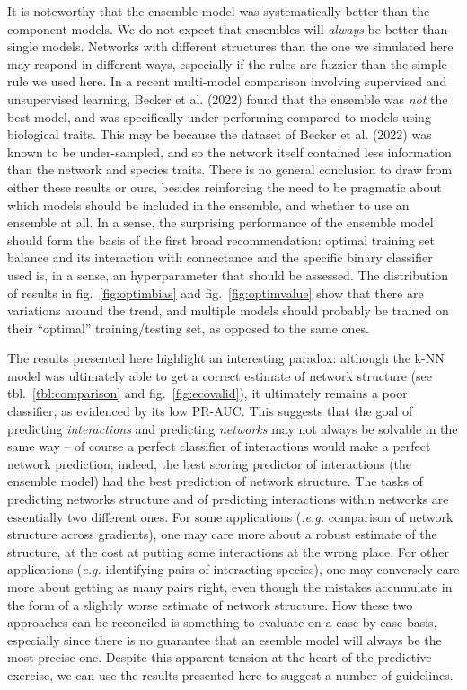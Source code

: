\documentclass[10pt,oneside]{article}
\begin{document}
It is noteworthy that the ensemble model was systematically better than
the component models. We do not expect that ensembles will \emph{always}
be better than single models. Networks with different structures than
the one we simulated here may respond in different ways, especially if
the rules are fuzzier than the simple rule we used here. In a recent
multi-model comparison involving supervised and unsupervised learning,
Becker et al. (2022) found that the ensemble was \emph{not} the best
model, and was specifically under-performing compared to models using
biological traits. This may be because the dataset of Becker et al.
(2022) was known to be under-sampled, and so the network itself
contained less information than the network and species traits. There is
no general conclusion to draw from either these results or ours, besides
reinforcing the need to be pragmatic about which models should be
included in the ensemble, and whether to use an ensemble at all. In a
sense, the surprising performance of the ensemble model should form the
basis of the first broad recommendation: optimal training set balance
and its interaction with connectance and the specific binary classifier
used is, in a sense, an hyperparameter that should be assessed. The
distribution of results in fig.~\ref{fig:optimbias} and
fig.~\ref{fig:optimvalue} show that there are variations around the
trend, and multiple models should probably be trained on their
``optimal'' training/testing set, as opposed to the same ones.

The results presented here highlight an interesting paradox: although
the k-NN model was ultimately able to get a correct estimate of network
structure (see tbl.~\ref{tbl:comparison} and fig.~\ref{fig:ecovalid}),
it ultimately remains a poor classifier, as evidenced by its low PR-AUC.
This suggests that the goal of predicting \emph{interactions} and
predicting \emph{networks} may not always be solvable in the same way --
of course a perfect classifier of interactions would make a perfect
network prediction; indeed, the best scoring predictor of interactions
(the ensemble model) had the best prediction of network structure. The
tasks of predicting networks structure and of predicting interactions
within networks are essentially two different ones. For some
applications (\emph{.e.g.} comparison of network structure across
gradients), one may care more about a robust estimate of the structure,
at the cost at putting some interactions at the wrong place. For other
applications (\emph{e.g.} identifying pairs of interacting species), one
may conversely care more about getting as many pairs right, even though
the mistakes accumulate in the form of a slightly worse estimate of
network structure. How these two approaches can be reconciled is
something to evaluate on a case-by-case basis, especially since there is
no guarantee that an esemble model will always be the most precise one.
Despite this apparent tension at the heart of the predictive exercise,
we can use the results presented here to suggest a number of guidelines.
\end{document}
